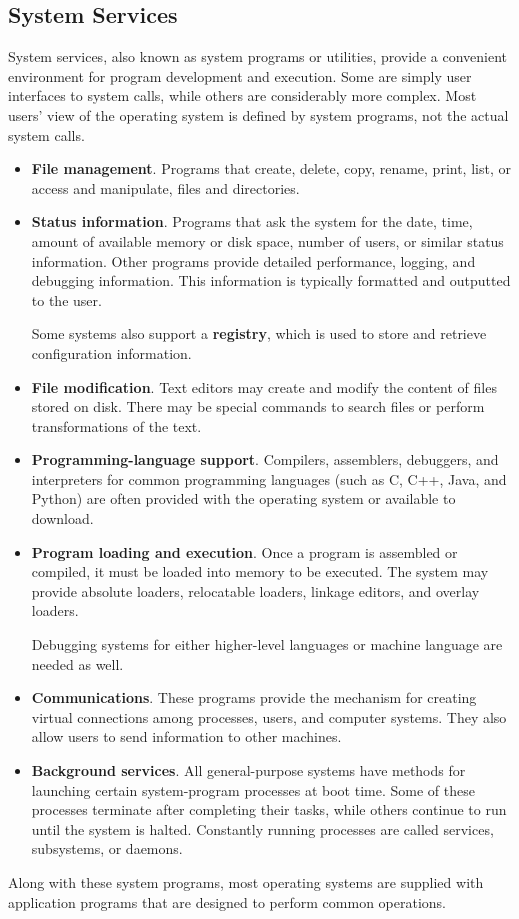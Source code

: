 \documentclass{article}
\begin{document}
\subsection{System Services}
System services, also known as system programs or utilities, provide a
convenient environment for program development and execution. Some are
simply user interfaces to system calls, while others are considerably
more complex. Most users' view of the operating system is defined by
system programs, not the actual system calls.
\begin{itemize}
    \item \textbf{File management}.
          Programs that create, delete, copy, rename, print, list, or
          access and manipulate, files and directories.
    \item \textbf{Status information}.
          Programs that ask the system for the date, time, amount of
          available memory or disk space, number of users, or similar
          status information.
          Other programs provide detailed performance, logging, and
          debugging information.
          This information is typically formatted and outputted to the
          user.

          Some systems also support a \textbf{registry}, which is used
          to store and retrieve configuration information.
    \item \textbf{File modification}.
          Text editors may create and modify the content of files
          stored on disk.
          There may be special commands to search files or perform
          transformations of the text.
    \item \textbf{Programming-language support}.
          Compilers, assemblers, debuggers, and interpreters for common
          programming languages (such as C, C++, Java, and Python) are
          often provided with the operating system or available to
          download.
    \item \textbf{Program loading and execution}.
          Once a program is assembled or compiled, it must be loaded
          into memory to be executed.
          The system may provide absolute loaders, relocatable loaders,
          linkage editors, and overlay loaders.

          Debugging systems for either higher-level languages or
          machine language are needed as well.
    \item \textbf{Communications}.
          These programs provide the mechanism for creating virtual
          connections among processes, users, and computer systems.
          They also allow users to send information to other machines.
    \item \textbf{Background services}.
          All general-purpose systems have methods for launching
          certain system-program processes at boot time.
          Some of these processes terminate after completing their
          tasks, while others continue to run until the system is
          halted.
          Constantly running processes are called services, subsystems,
          or daemons.
\end{itemize}
Along with these system programs, most operating systems are supplied
with application programs that are designed to perform common
operations.
\end{document}
